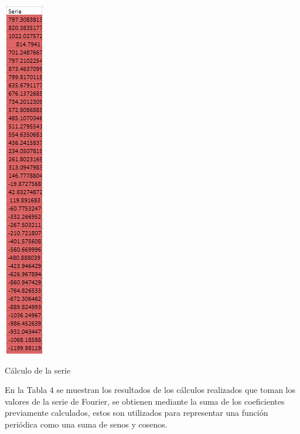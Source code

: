 \begin{table}[H]
    \centering
    \includegraphics[width=0.69792in,height=6.19792in]{media/image28.png}
    \caption{Cálculo de la serie}
\end{table}
En la Tabla 4 se muestran los resultados de los cálculos realizados que toman los valores de la serie de Fourier, se obtienen mediante la suma de los coeficientes previamente calculados, estos son utilizados para representar una función periódica como una suma de senos y cosenos.

